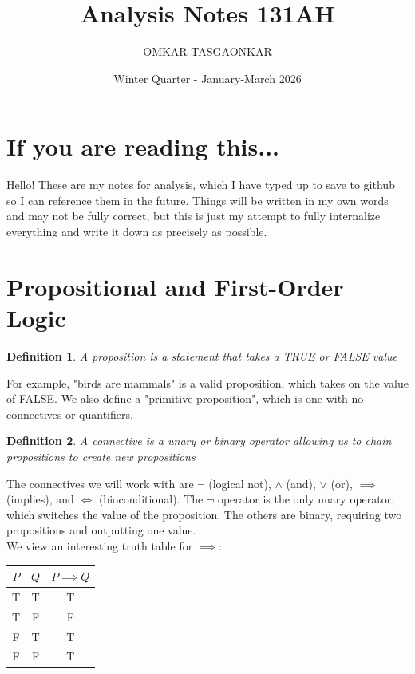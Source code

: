 \documentclass{article}
\title{Analysis Notes 131AH}
\author{OMKAR TASGAONKAR}
\date{Winter Quarter - January-March 2026}
\newtheorem{defn}{Definition}[section]
\begin{document}
\maketitle
\section*{If you are reading this...}
Hello! These are my notes for analysis, which I have typed up to save to github so I can reference them in the future. Things will be written in my own words and may not be fully correct, but this is just my attempt to fully internalize everything and write it down as precisely as possible.
\tableofcontents
\pagebreak

\section{Propositional and First-Order Logic}
\begin{defn}
    A proposition is a statement that takes a TRUE or FALSE value
\end{defn}
For example, "birds are mammals" is a valid proposition, which takes on the value of FALSE. We also define a "primitive proposition", which is one with no connectives or quantifiers.\\

\begin{defn}
    A connective is a unary or binary operator allowing us to chain propositions to create new propositions
\end{defn}
The connectives we will work with are $\lnot$ (logical not), $\land$ (and), $\lor$ (or), $\implies$ (implies), and $\iff$ (bioconditional). The $\lnot$ operator is the only unary operator, which switches the value of the proposition. The others are binary, requiring two propositions and outputting one value.\\

We view an interesting truth table for $\implies$:
\begin{center}
\begin{tabular}{| c | c  | c |}
\hline
$P$ & $Q$ & $P \implies Q$ \\
\hline
T & T & T\\
T & F & F\\
F & T & T\\
F & F & T\\
\hline
\end{tabular}
\end{center}
\end{document}
